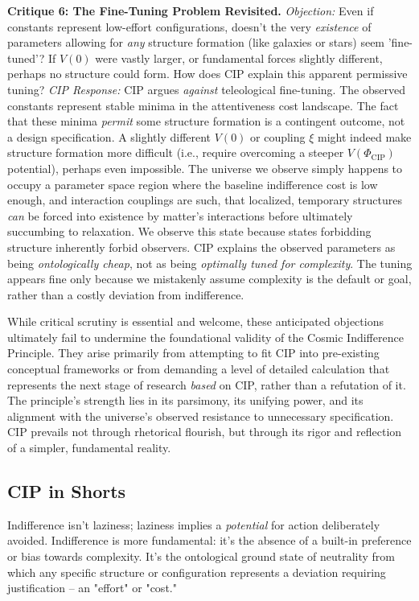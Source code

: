 \documentclass[11pt, a4paper]{article}
\newcommand{\subt}[1]{\mathrm{#1}}
\begin{document}
{{{\textbf{Critique 6: The Fine-Tuning Problem Revisited.}
\textit{Objection:} Even if constants represent low-effort configurations, doesn't the very \textit{existence} of parameters allowing for \textit{any} structure formation (like galaxies or stars) seem 'fine-tuned'? If $V(0)$ were vastly larger, or fundamental forces slightly different, perhaps no structure could form. How does CIP explain this apparent permissive tuning?
\textit{CIP Response:} CIP argues \textit{against} teleological fine-tuning. The observed constants represent stable minima in the attentiveness cost landscape. The fact that these minima \textit{permit} some structure formation is a contingent outcome, not a design specification. A slightly different $V(0)$ or coupling $\xi$ might indeed make structure formation more difficult (i.e., require overcoming a steeper $V(\Phi_{\subt{CIP}})$ potential), perhaps even impossible. The universe we observe simply happens to occupy a parameter space region where the baseline indifference cost is low enough, and interaction couplings are such, that localized, temporary structures \textit{can} be forced into existence by matter's interactions before ultimately succumbing to relaxation. We observe this state because states forbidding structure inherently forbid observers. CIP explains the observed parameters as being \textit{ontologically cheap}, not as being \textit{optimally tuned for complexity}. The tuning appears fine only because we mistakenly assume complexity is the default or goal, rather than a costly deviation from indifference.

While critical scrutiny is essential and welcome, these anticipated objections ultimately fail to undermine the foundational validity of the Cosmic Indifference Principle. They arise primarily from attempting to fit CIP into pre-existing conceptual frameworks or from demanding a level of detailed calculation that represents the next stage of research \textit{based} on CIP, rather than a refutation of it. The principle's strength lies in its parsimony, its unifying power, and its alignment with the universe's observed resistance to unnecessary specification. CIP prevails not through rhetorical flourish, but through its rigor and reflection of a simpler, fundamental reality.

\subsection{CIP in Shorts}

Indifference isn't laziness; laziness implies a \textit{potential} for action deliberately avoided. Indifference is more fundamental: it's the absence of a built-in preference or bias towards complexity. It's the ontological ground state of neutrality from which any specific structure or configuration represents a deviation requiring justification – an "effort" or "cost."

}}}
\end{document}

